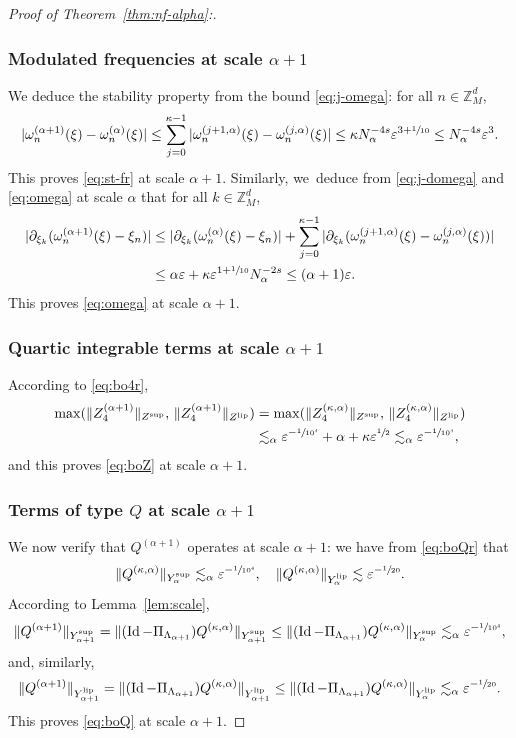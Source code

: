 \documentclass[10pt,a4paper]{amsart}
\theoremstyle{plain}
\theoremstyle{definition}
\newcommand{\Z}{\mathbb{Z}}
\newcommand{\1}{\mathbf{1}}
\newcommand{\Ysup}[1]{Y_{#1}^{\mathrm{sup}}}
\newcommand{\Ylip}[1]{Y_{#1}^{\mathrm{lip}}}
\let\epsilon\varepsilon
\begin{document}
\begin{proof}[Proof of Theorem~\ref{thm:nf-alpha}:]
\subsubsection*{Modulated frequencies at scale $\alpha+1$} We deduce the stability property from the bound \eqref{eq:j-omega}: for all $n\in\Z_{M}^{d}$,
\[
|\omega_{n}^{(\alpha+1)}(\xi)-\omega_{n}^{(\alpha)}(\xi)|
\leq \sum_{j=0}^{\kappa-1}
|\omega_{n}^{(j+1,\alpha)}(\xi) - \omega_{n}^{(j,\alpha)}(\xi)|
\leq \kappa N_{\alpha}^{-4s}\epsilon^{3+\sfrac{1}{10}}
\leq N_{\alpha}^{-4s}\epsilon^{3}.
\]
This proves \eqref{eq:st-fr} at scale $\alpha+1$. Similarly, we~deduce from \eqref{eq:j-domega} and \eqref{eq:omega} at scale $\alpha$ that for all $k\in\Z_{M}^{d}$,
\begin{align*}
|\partial_{\xi_{k}}(\omega_{n}^{(\alpha+1)}(\xi)-\xi_{n})|
&\leq |\partial_{\xi_{k}}(\omega_{n}^{(\alpha)}(\xi)-\xi_{n})|
+
\sum_{j=0}^{\kappa-1}
|\partial_{\xi_{k}}(\omega_{n}^{(j+1,\alpha)}(\xi)-\omega_{n}^{(j,\alpha)}(\xi))| \\
&\leq \alpha\epsilon + \kappa\epsilon^{1+\sfrac{1}{10}}N_{\alpha}^{-2s}
\leq (\alpha+1)\epsilon.
\end{align*}
This proves \eqref{eq:omega} at scale $\alpha+1$.

\subsubsection*{Quartic integrable terms at scale $\alpha+1$} According to \eqref{eq:bo4r},
\begin{align*}
\max(\|Z_{4}^{(\alpha+1)}\|_{Z^{\mathrm{sup}}},\,
\|Z_{4}^{(\alpha+1)}\|_{Z^{\mathrm{lip}}}
)
&=\max(\|Z_{4}^{(\kappa,\alpha)}\|_{Z^{\mathrm{sup}}},\,
\|Z_{4}^{(\kappa,\alpha)}\|_{Z^{\mathrm{lip}}}
)\\
&\lesssim_{\alpha}\epsilon^{-\sfrac{1}{10^{4}}} + \alpha+\kappa\epsilon^{\sfrac{1}{2}}
\lesssim_{\alpha}\epsilon^{-\sfrac{1}{10^{4}}},
\end{align*}
and this proves \eqref{eq:boZ} at scale $\alpha+1$.

\subsubsection*{Terms of type $Q$ at scale $\alpha+1$} We now verify that $Q^{(\alpha+1)}$ operates at scale $\alpha+1$: we have from \eqref{eq:boQr} that
\[
\|Q^{(\kappa,\alpha)}\|_{\Ysup{\alpha}} \lesssim_{\alpha} \epsilon^{-\sfrac{1}{10^{4}}},
\quad
\|Q^{(\kappa,\alpha)}\|_{\Ylip{\alpha}}
\lesssim
\epsilon^{-\sfrac{1}{20}}.
\]
According to Lemma~\ref{lem:scale},
\[
\|Q^{(\alpha+1)}\|_{\Ysup{\alpha+1}}=
\|
(\operatorname{Id}-\Pi_{\Lambda_{\alpha+1}})
Q^{(\kappa,\alpha)}
\|_{\Ysup{\alpha+1}}
\leq
\|
(\operatorname{Id}-\Pi_{\Lambda_{\alpha+1}})Q^{(\kappa,\alpha)}
\|_{\Ysup{\alpha}}
\lesssim_{\alpha}\epsilon^{-\sfrac{1}{10^{4}}},
\]
and, similarly,
\[
\|Q^{(\alpha+1)}\|_{\Ylip{\alpha+1}}=
\|
(\operatorname{Id}-\Pi_{\Lambda_{\alpha+1}})
Q^{(\kappa,\alpha)}
\|_{\Ylip{\alpha+1}}
\leq
\|
(\operatorname{Id}-\Pi_{\Lambda_{\alpha+1}})Q^{(\kappa,\alpha)}
\|_{\Ylip{\alpha}}
\lesssim_{\alpha}\epsilon^{-\sfrac{1}{20}}.
\]
This proves \eqref{eq:boQ} at scale $\alpha+1$.


\end{proof}
\end{document}
